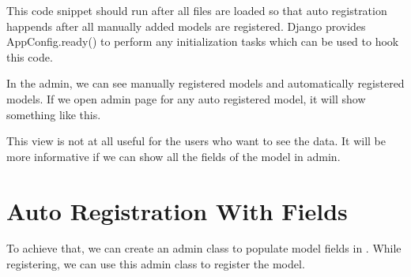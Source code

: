 \documentclass[letterpaper,11pt,english]{sphinxmanual}
\begin{document}
This code snippet should run after all  files are loaded so that auto registration happends after all manually added models are registered. Django provides AppConfig.ready() to perform any initialization tasks which can be used to hook this code.

\begin{sphinxVerbatim}[commandchars=\\\{\}]

    
   


 

     
          
           
             
\end{sphinxVerbatim}

In the admin, we can see manually registered models and automatically registered models. If we open admin page for any auto registered model, it will show something like this.


This view is not at all useful for the users who want to see the data. It will be more informative if we can show all the fields of the model in admin.


\section{Auto Registration With Fields}
\label{\detokenize{admin_auto_register_models:auto-registration-with-fields}}
To achieve that, we can create an admin class to populate model fields in . While registering, we can use this admin class to register the model.
\end{document}
